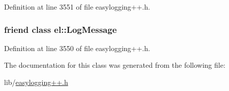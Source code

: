 Definition at line 3551 of file easylogging++.\+h.

\hypertarget{classel_1_1_logger_a22965b691242a9f61d443ba03fce3e35}{}
\subsubsection[{el\+::\+Log\+Message}]{\setlength{\rightskip}{0pt plus 5cm}friend class {\bf el\+::\+Log\+Message}\hspace{0.3cm}{\ttfamily [friend]}}\label{classel_1_1_logger_a22965b691242a9f61d443ba03fce3e35}


Definition at line 3550 of file easylogging++.\+h.



The documentation for this class was generated from the following file\+:\begin{DoxyCompactItemize}
\item 
lib/\hyperlink{easylogging_09_09_8h}{easylogging++.\+h}\end{DoxyCompactItemize}

